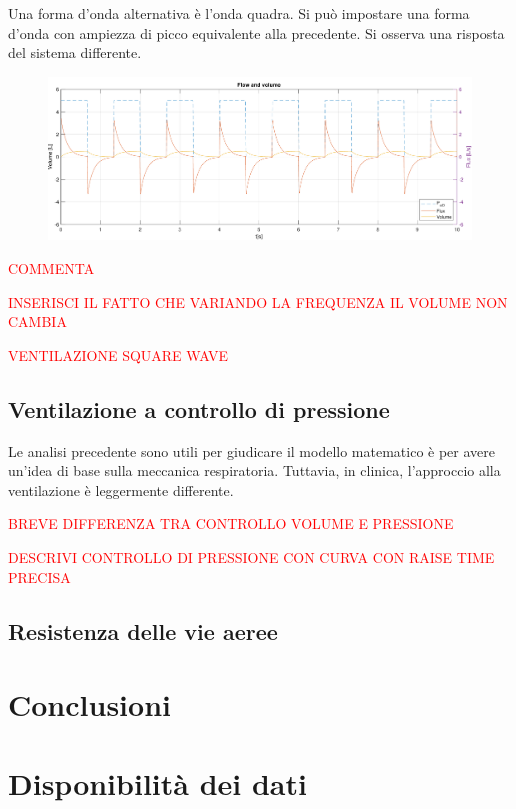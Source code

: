 Una forma d'onda alternativa è l'onda quadra. Si può impostare una forma d'onda con ampiezza di picco equivalente alla precedente. Si osserva una risposta del sistema differente.

\begin{figure}[t!]
	\centering
	\includegraphics[width=0.95\linewidth]{../model/data_log/data_square_wave_freq_45_long.pdf}
	\caption{}
	\label{fig:square_wave_45}
\end{figure}

\textcolor{red}{COMMENTA}

\textcolor{red}{INSERISCI IL FATTO CHE VARIANDO LA FREQUENZA IL VOLUME NON CAMBIA}

\textcolor{red}{VENTILAZIONE SQUARE WAVE}

\subsection{Ventilazione a controllo di pressione}

Le analisi precedente sono utili per giudicare il modello matematico è per avere un'idea di base sulla meccanica respiratoria. Tuttavia, in clinica, l'approccio alla ventilazione è leggermente differente.

\textcolor{red}{BREVE DIFFERENZA TRA CONTROLLO VOLUME E PRESSIONE}

\textcolor{red}{DESCRIVI CONTROLLO DI PRESSIONE CON CURVA CON RAISE TIME PRECISA}

\subsection{Resistenza delle vie aeree}

\textcolor{blue}{
	\lipsum[1-4]
}
\section{Conclusioni}

\textcolor{blue}{
	\lipsum[1-2]
}
\section*{Disponibilità dei dati}

